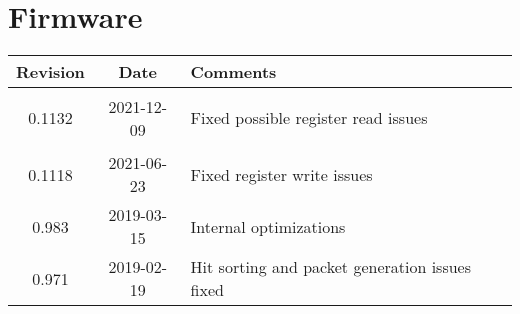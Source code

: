 \section{Firmware}
\begin{tabularx}{\textwidth}{|c|c|X|}
    \hline
    Revision & Date & Comments\\
    \hline\hline
    \hypertarget{fwrev}{0.1132} & 2021-12-09 & Fixed possible register read issues\\
    \hline
	0.1118 & 2021-06-23 & Fixed register write issues\\
    \hline
    0.983 & 2019-03-15 & Internal optimizations\\
    \hline
    0.971 & 2019-02-19 & Hit sorting and packet generation issues fixed\\
    \hline
\end{tabularx}